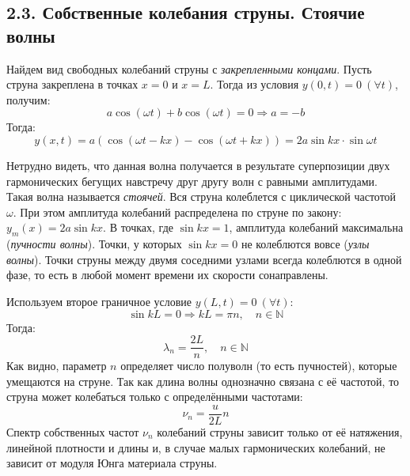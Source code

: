 \documentclass[a4paper]{article}
\begin{document}
\subsection*{2.3. Собственные колебания струны. Стоячие волны} 

\noindent
Найдем вид свободных колебаний струны с \textit{закрепленными концами}. Пусть струна закреплена в точках $x = 0$ и $x = L$. Тогда из условия $y(0, t) = 0 \ (\forall t)$, получим:
\begin{equation}
a \cos(\omega t) + b \cos(\omega t) = 0 \Rightarrow a = -b
\end{equation} 
Тогда:
\begin{equation}\label{eq9}
y(x,t) = a(\cos(\omega t - k x) - \cos(\omega t + k x)) = 2 a \sin{kx} \cdot \sin{\omega t}
\end{equation}

\noindent
Нетрудно видеть, что данная волна получается в результате суперпозиции двух гармонических бегущих навстречу друг другу волн с равными амплитудами. Такая волна называется \textit{стоячей}. Вся струна колеблется с циклической частотой $\omega$. При этом амплитуда колебаний распределена по струне по закону: $y_m(x) = 2 a \sin{kx}$. В точках, где $\sin{kx} = 1$, амплитуда колебаний максимальна (\textit{пучности волны}). Точки, у которых $\sin{kx} = 0$ не колеблются вовсе (\textit{узлы волны}). Точки струны между двумя соседними узлами всегда колеблются в одной фазе, то есть в любой момент времени их скорости сонаправлены.

\noindent
Используем второе граничное условие $y(L, t) = 0 \ (\forall t)$:
\begin{equation}
\sin{kL} = 0 \Rightarrow kL = \pi n, \quad n \in \mathbb {N} 
\end{equation}
Тогда:
\begin{equation}
\lambda_n = \frac{2L}{n}, \quad n \in \mathbb{N}
\end{equation}
Как видно, параметр $n$ определяет число полуволн (то есть пучностей), которые умещаются на струне. Так как длина волны однозначно связана с её частотой, то струна может колебаться только с определёнными частотами:
\begin{equation}\label{eq12}
\nu_n = \frac{u}{2L} n
\end{equation}
Спектр собственных частот $\nu_n$ колебаний струны зависит только от её натяжения, линейной плотности и длины и, в случае малых гармонических колебаний, не зависит от модуля Юнга материала струны.
\end{document}
